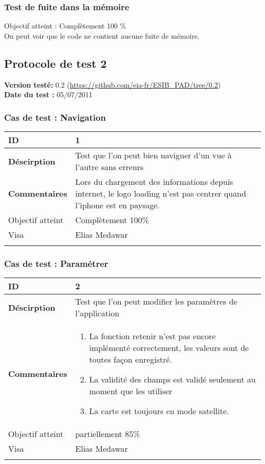 		 \subsubsection*{Test de fuite dans la mémoire}
		 Objectif atteint : {\color{green}Complètement 100 \% \CheckedBox}\\
		 On peut voir que le code ne contient aucune fuite de mémoire.
		 
		 
		\subsection{Protocole de test 2}
		 		\textbf{Version testé:} 0.2 (\url{https://github.com/eia-fr/ESIB_PAD/tree/0.2}) \\
		 		\textbf{	Date du test :} 05/07/2011
		 
		 		\subsubsection*{Cas de test : Navigation}
		 				 \begin{longtable}{m{4cm}|p{10cm}|}
		 				 \textbf{ ID} & 1 \\
		 				 \hline \textbf{Déscirption} & Test que l'on peut bien naviguer d'un vue à l'autre sans erreurs\\
		 				 \hline \textbf{Commentaires} &Lors du chargement des informations depuis internet, le logo loading n'est pas centrer quand l'iphone est en paysage. \\
		 				 \hline Objectif  atteint & {\color{green} Complètement 100\% \CheckedBox } \\
		 				\hline Visa & Elias Medawar \\	
		 				 \\
		 			 \end{longtable} 
		  		\subsubsection*{Cas de test : Paramétrer}
		 		 \begin{longtable}{m{4cm}|p{10cm}|}
		 		 \textbf{ ID} & 2 \\
		 		 \hline \textbf{Déscirption} & Test que l'on peut modifier les paramètres de l'application\\
		 		 \hline \textbf{Commentaires} & 
		 		 	 	 \begin{enumerate}
		 				  		\item La fonction retenir n'est pas encore implémenté correctement, les valeurs sont de toutes façon enregistré.
		 				  		\item La validité des champs est validé seulement au moment que les utiliser
		 				  		\item La carte est toujours en mode satellite.
		 				  	\end{enumerate} \\
		  				\hline Objectif atteint &  {\color{red}partiellement 85\% \XBox} \\
		  				\hline Visa & Elias Medawar 	\\
		 		 \\
		 		  \end{longtable} 		 		 

